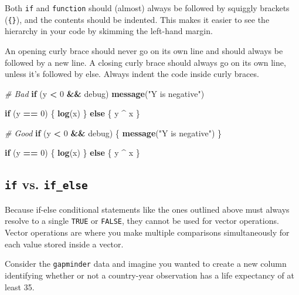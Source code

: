 \documentclass[]{book}
\newenvironment{Shaded}{\begin{snugshade}}{\end{snugshade}}
\newcommand{\KeywordTok}[1]{\textcolor[rgb]{0.13,0.29,0.53}{\textbf{#1}}}
\newcommand{\DecValTok}[1]{\textcolor[rgb]{0.00,0.00,0.81}{#1}}
\newcommand{\StringTok}[1]{\textcolor[rgb]{0.31,0.60,0.02}{#1}}
\newcommand{\CommentTok}[1]{\textcolor[rgb]{0.56,0.35,0.01}{\textit{#1}}}
\newcommand{\ControlFlowTok}[1]{\textcolor[rgb]{0.13,0.29,0.53}{\textbf{#1}}}
\newcommand{\OperatorTok}[1]{\textcolor[rgb]{0.81,0.36,0.00}{\textbf{#1}}}
\newcommand{\NormalTok}[1]{#1}
\begin{document}
Both \texttt{if} and \texttt{function} should (almost) always be
followed by squiggly brackets (\texttt{\{\}}), and the contents should
be indented. This makes it easier to see the hierarchy in your code by
skimming the left-hand margin.

An opening curly brace should never go on its own line and should always
be followed by a new line. A closing curly brace should always go on its
own line, unless it's followed by else. Always indent the code inside
curly braces.

\begin{Shaded}
\begin{Highlighting}[]
\CommentTok{# Bad}
\ControlFlowTok{if}\NormalTok{ (y }\OperatorTok{<}\StringTok{ }\DecValTok{0} \OperatorTok{&&}\StringTok{ }\NormalTok{debug)}
\KeywordTok{message}\NormalTok{(}\StringTok{"Y is negative"}\NormalTok{)}

\ControlFlowTok{if}\NormalTok{ (y }\OperatorTok{==}\StringTok{ }\DecValTok{0}\NormalTok{) \{}
  \KeywordTok{log}\NormalTok{(x)}
\NormalTok{\} }
\ControlFlowTok{else}\NormalTok{ \{}
\NormalTok{  y }\OperatorTok{^}\StringTok{ }\NormalTok{x}
\NormalTok{\}}

\CommentTok{# Good}
\ControlFlowTok{if}\NormalTok{ (y }\OperatorTok{<}\StringTok{ }\DecValTok{0} \OperatorTok{&&}\StringTok{ }\NormalTok{debug) \{}
  \KeywordTok{message}\NormalTok{(}\StringTok{"Y is negative"}\NormalTok{)}
\NormalTok{\}}

\ControlFlowTok{if}\NormalTok{ (y }\OperatorTok{==}\StringTok{ }\DecValTok{0}\NormalTok{) \{}
  \KeywordTok{log}\NormalTok{(x)}
\NormalTok{\} }\ControlFlowTok{else}\NormalTok{ \{}
\NormalTok{  y }\OperatorTok{^}\StringTok{ }\NormalTok{x}
\NormalTok{\}}
\end{Highlighting}
\end{Shaded}

\subsection{\texorpdfstring{\texttt{if} vs.
\texttt{if\_else}}{if vs. if\_else}}\label{if-vs.-if_else}

Because if-else conditional statements like the ones outlined above must
always resolve to a single \texttt{TRUE} or \texttt{FALSE}, they cannot
be used for vector operations. Vector operations are where you make
multiple comparisons simultaneously for each value stored inside a
vector.

Consider the \texttt{gapminder} data and imagine you wanted to create a
new column identifying whether or not a country-year observation has a
life expectancy of at least 35.
\end{document}
